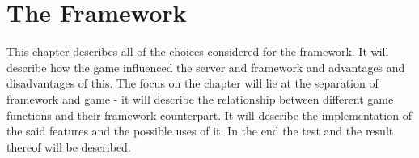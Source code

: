 \chapter{The Framework}

This chapter describes all of the choices considered for the framework. It will describe how the game influenced the server and framework and advantages and disadvantages of this. The focus on the chapter will lie at the separation of framework and game - it will describe the relationship between different game functions and their framework counterpart. It will describe the implementation of the said features and the possible uses of it. In the end the test and the result thereof will be described.



